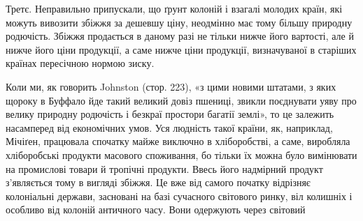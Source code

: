 Третє. Неправильно припускали, що ґрунт колоній і взагалі молодих
країн, які можуть вивозити збіжжя за дешевшу ціну, неодмінно має тому більшу
природну родючість. Збіжжя продається в даному разі не тільки нижче його
вартості, але й нижче його ціни продукції, а саме нижче ціни продукції, визначуваної
в старіших країнах пересічною нормою зиску.

Коли ми, як говорить Johnston (стор. 223), «з цими новими штатами, з
яких щороку в Буффало йде такий великий довіз пшениці, звикли поєднувати
уяву про велику природну родючість і безкраї простори багатії землі», то це
залежить насамперед від економічних умов. Уся людність такої країни, як, наприклад,
Мічіґен, працювала спочатку майже виключно в хліборобстві, а саме,
виробляла хліборобські продукти масового споживання, бо тільки їх можна було
вимінювати на промислові товари й тропічні продукти. Ввесь його надмірний продукт
з’являється тому в вигляді збіжжя. Це вже від самого початку відрізняє
колоніальні держави, засновані на базі сучасного світового ринку, віл
колишніх і особливо від колоній античного часу. Вони одержують через світовий
\parbreak{}  %
